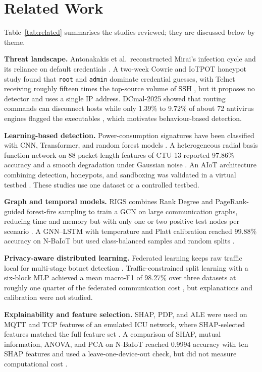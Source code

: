 \section{Related Work}
Table~\ref{tab:related} summarises the studies reviewed; they are discussed below by theme.

\textbf{Threat landscape.} Antonakakis et al.\ reconstructed Mirai's infection cycle and its reliance on default credentials \cite{antonakakis2017}. A two-week Cowrie and IoTPOT honeypot study found that \texttt{root} and \texttt{admin} dominate credential guesses, with Telnet receiving roughly fifteen times the top-source volume of SSH \cite{banoth2026}, but it proposes no detector and uses a single IP address. DCmal-2025 showed that routing commands can disconnect hosts while only 1.39\% to 9.72\% of about 72 antivirus engines flagged the executables \cite{abujazoh2025}, which motivates behaviour-based detection.

\textbf{Learning-based detection.} Power-consumption signatures have been classified with CNN, Transformer, and random forest models \cite{wakili2025}. A heterogeneous radial basis function network on 88 packet-length features of CTU-13 reported 97.86\% accuracy and a smooth degradation under Gaussian noise \cite{awad2026}. An AIoT architecture combining detection, honeypots, and sandboxing was validated in a virtual testbed \cite{memos2026}. These studies use one dataset or a controlled testbed.

\textbf{Graph and temporal models.} RIGS combines Rank Degree and PageRank-guided forest-fire sampling to train a GCN on large communication graphs, reducing time and memory but with only one or two positive test nodes per scenario \cite{chai2026}. A GNN--LSTM with temperature and Platt calibration reached 99.88\% accuracy on N-BaIoT but used class-balanced samples and random splits \cite{babenko2026}.

\textbf{Privacy-aware distributed learning.} Federated learning keeps raw traffic local for multi-stage botnet detection \cite{sudheera2026}. Traffic-constrained split learning with a six-block MLP achieved a mean macro-F1 of 98.27\% over three datasets at roughly one quarter of the federated communication cost \cite{aljaafreh2026}, but explanations and calibration were not studied.

\textbf{Explainability and feature selection.} SHAP, PDP, and ALE were used on MQTT and TCP features of an emulated ICU network, where SHAP-selected features matched the full feature set \cite{georgiades2025}. A comparison of SHAP, mutual information, ANOVA, and PCA on N-BaIoT reached 0.9994 accuracy with ten SHAP features and used a leave-one-device-out check, but did not measure computational cost \cite{hua2026}.

